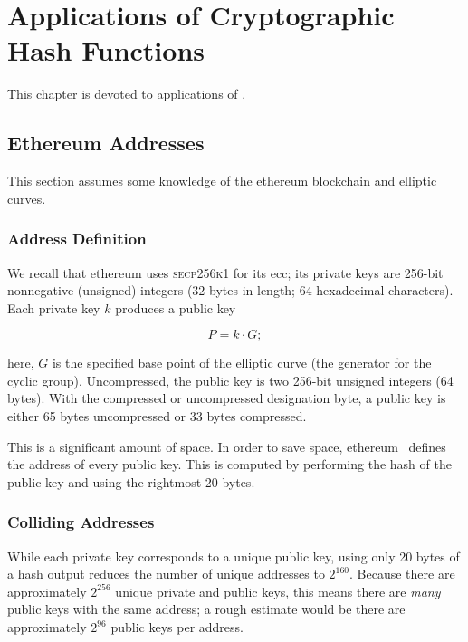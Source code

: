 \chapter{Applications of Cryptographic Hash Functions}
\label{chap:hash_applications}

This chapter is devoted to applications of .



\section{Ethereum Addresses}

This section assumes some knowledge of the \gls{ethereum} blockchain and
\glspl{elliptic curve}.

\subsection{Address Definition}

We recall that \gls{ethereum} uses \textsc{secp256k1}
for its \gls{ecc};
its private keys are 256-bit nonnegative (unsigned) integers
(32 bytes in length; 64 hexadecimal characters).
Each private key $k$ produces a public key

\begin{equation}
    P = k\cdot G;
\end{equation}

\noindent
here, $G$ is the specified base point of the \gls{elliptic curve}
(the generator for the \gls{cyclic group}).
Uncompressed, the public key is two 256-bit unsigned integers
(64 bytes).
With the compressed or uncompressed designation byte,
a public key is either 65 bytes uncompressed or 33 bytes compressed.

This is a significant amount of space.
In order to save space, \gls{ethereum}~\cite[Eq.~314]{EthereumYellowpaper}
defines the address of every public key.
This is computed by performing the \Keccak{} hash of the public key
and using the rightmost 20 bytes.

\subsection{Colliding Addresses}

While each private key corresponds to a unique public key,
using only 20 bytes of a hash output reduces the
number of unique addresses to $2^{160}$.
Because there are approximately $2^{256}$ unique private and public keys,
this means there are \emph{many} public keys with the same address;
a rough estimate would be there are approximately $2^{96}$ public keys
per address.

